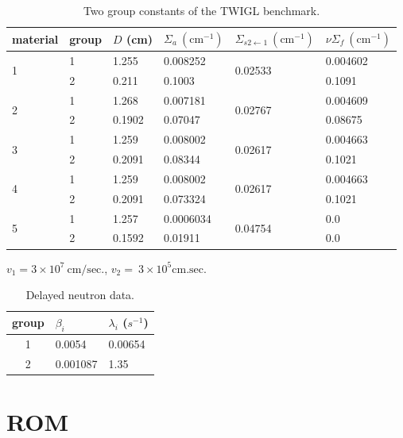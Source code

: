 \documentclass[]{interact}
\theoremstyle{plain}%
\theoremstyle{definition}
\theoremstyle{remark}
\begin{document}
\begin{table}[h!]
	\centering
	\begin{tabular}{l|l|l|l| l|l}
		material & group  & $D$ (cm) & $\Sigma_{a} ~ (\text{cm}^{-1})$ & $\Sigma_{s2\gets 1}~ (\text{cm}^{-1})$ & $\nu\Sigma_{f}~ (\text{cm}^{-1})$ \\\hline
		\multirow{2}{*}{1}& 1   & 1.255  &  0.008252   &  \multirow{2}{*}{0.02533} & 0.004602 \\	
		& 2   & 0.211  &  0.1003     &           & 0.1091  \\
		\hline
		
		\multirow{2}{*}{2}& 1   & 1.268  &  0.007181    & \multirow{2}{*}{0.02767} & 0.004609 \\	
		& 2   & 0.1902 &  0.07047     &           &  0.08675\\
		\hline
		
		\multirow{2}{*}{3}& 1   & 1.259  &  0.008002    & \multirow{2}{*}{0.02617}     & 0.004663 \\	
		& 2   & 0.2091 &  0.08344     &    &    0.1021 \\
		\hline
		\multirow{2}{*}{4}& 1   & 1.259  &  0.008002    & \multirow{2}{*}{0.02617}  &  0.004663 \\	
		& 2   & 0.2091 &  0.073324    &           &  0.1021   \\
		\hline
		\multirow{2}{*}{5}& 1   & 1.257  &  0.0006034   &  \multirow{2}{*}{0.04754}  & 0.0 \\	
		& 2   & 0.1592 &   0.01911    &        & 0.0 \\
		\hline
	\end{tabular}
	{\raggedright $v_1 = 3\times10^{7} ~\text{cm/sec}. $,  $v_2 = ~3\times10^{5} \text{cm.sec}.$  \par}
	\caption{Two group constants of the TWIGL benchmark.}
	\label{tab:twogroup}
\end{table}


\begin{table}[h!]
	\centering
	\begin{tabular}{c|l|l}
		group & $\beta_i$  & $\lambda_i$ ($s^{-1}$)  \\
		\hline
		1    &  0.0054 & 0.00654 \\
		2    &  0.001087 & 1.35  \\
		\hline
	\end{tabular}
	\caption{Delayed neutron data.}
	\label{tab:precursor data}
\end{table}


\section{ROM}
\end{document}
